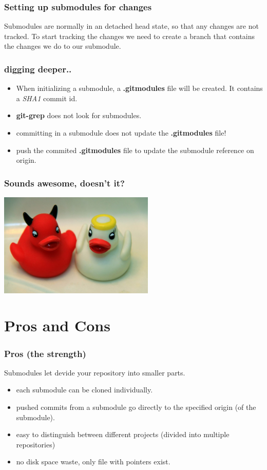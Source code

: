 \documentclass[10pt]{beamer}
\begin{document}
\begin{frame}[fragile]
  \frametitle{Setting up submodules for changes}
   Submodules are normally in an detached head state, so that any changes are not tracked. To start tracking the changes we need to create a branch that contains the changes we do to our submodule.

\end{frame}

\begin{frame}
	\frametitle{digging deeper..}
	\begin{itemize}
		\item When initializing a submodule, a \textbf{.gitmodules} file will be created. It contains a \emph{SHA1} commit id.
		\item \textbf{git-grep} does not look for submodules.
		\item committing in a submodule does not update the \textbf{.gitmodules} file!
		\item push the commited \textbf{.gitmodules} file to update the submodule reference on origin.
	\end{itemize}
\end{frame}

\begin{frame}
	\frametitle{Sounds awesome, doesn't it?}
\begin{center}\includegraphics[width=280px]{images/goodbad.jpg}\end{center}
\end{frame}

\section{Pros and Cons}

\begin{frame}
  \frametitle{Pros (the strength)}
  	Submodules let devide your repository into smaller parts.
	\begin{itemize}
		\item each submodule can be cloned individually.
		\item pushed commits from a submodule go directly to the specified origin (of the submodule).
		\item easy to distinguish between different projects (divided into multiple repositories)
		\item no disk space waste, only file with pointers exist.
	\end{itemize}
\end{frame}
\end{document}
